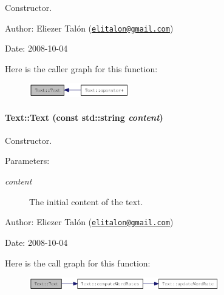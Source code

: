 Constructor. 

\begin{Desc}
\item[Author:]Eliezer Talón (\href{mailto:elitalon@gmail.com}{\tt elitalon@gmail.com}) \end{Desc}
\begin{Desc}
\item[Date:]2008-10-04 \end{Desc}


Here is the caller graph for this function:\nopagebreak
\begin{figure}[H]
\begin{center}
\leavevmode
\includegraphics[width=124pt]{class_text_b3e26143fccc52699bcc5149cae852bc_icgraph}
\end{center}
\end{figure}
\hypertarget{class_text_c3c20ee8baeb7b88e2622724f57e50a2}{
\paragraph[{Text}]{\setlength{\rightskip}{0pt plus 5cm}Text::Text (const std::string {\em content})}\hfill}
\label{class_text_c3c20ee8baeb7b88e2622724f57e50a2}


Constructor. 

\begin{Desc}
\item[Parameters:]
\begin{description}
\item[{\em content}]The initial content of the text.\end{description}
\end{Desc}
\begin{Desc}
\item[Author:]Eliezer Talón (\href{mailto:elitalon@gmail.com}{\tt elitalon@gmail.com}) \end{Desc}
\begin{Desc}
\item[Date:]2008-10-04 \end{Desc}


Here is the call graph for this function:\nopagebreak
\begin{figure}[H]
\begin{center}
\leavevmode
\includegraphics[width=235pt]{class_text_c3c20ee8baeb7b88e2622724f57e50a2_cgraph}
\end{center}
\end{figure}


